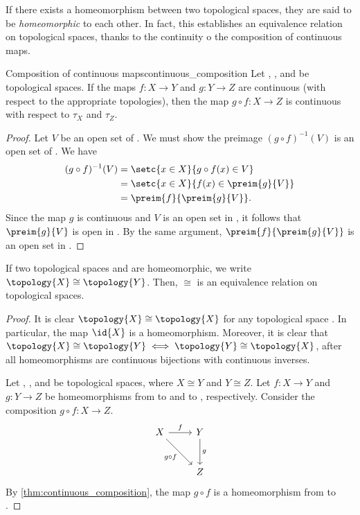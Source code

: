 If there exists a homeomorphism between two topological spaces, they are said to be \emph{homeomorphic} to each other. In fact, this establishes an equivalence relation on topological spaces, thanks to the continuity o the composition of continuous maps.
\begin{theorem}{Composition of continuous maps}{continuous_composition}
Let , , and  be topological spaces. If the maps \(f: X \to Y\) and \(g : Y \to Z\) are continuous (with respect to the appropriate topologies), then the map \(g \circ f : X \to Z\) is continuous with respect to \(\tau_X\) and \(\tau_Z\).
\end{theorem}
\begin{proof}
    Let \(V\) be an open set of . We must show the preimage \((g \circ f)^{-1}(V)\) is an open set of . We have
    \begin{align*}
        (g\circ f)^{-1}(V) &= \setc{x \in X }{g\circ f(x) \in V}\\
                           &= \setc{x \in X }{f(x) \in \preim{g}{V}}\\
                           &= \preim{f}{\preim{g}{V}}.
    \end{align*}
    Since the map \(g\) is continuous and \(V\) is an open set in , it follows that \(\preim{g}{V}\) is open in . By the same argument, \(\preim{f}{\preim{g}{V}}\) is an open set in .
\end{proof}

\begin{corollary}
    If two topological spaces  and  are homeomorphic, we write \(\topology{X} \cong \topology{Y}\). Then, \(\cong\) is an equivalence relation on topological spaces.
\end{corollary}
\begin{proof}
    It is clear \(\topology{X} \cong \topology{X}\) for any topological space . In particular, the map \(\id{X}\) is a homeomorphism. Moreover, it is clear that \(\topology{X} \cong \topology{Y} \iff \topology{Y} \cong \topology{X}\), after all homeomorphisms are continuous bijections with continuous inverses.

    Let , , and  be topological spaces, where \(X \cong Y\) and \(Y \cong Z\). Let \(f : X \to Y\) and \(g : Y \to Z\) be homeomorphisms from  to  and  to , respectively. Consider the composition \(g\circ f : X \to Z\).
    \begin{equation*}
        \begin{tikzcd}[column sep = normal, row sep = large]
            X \arrow{r}{f} \arrow[swap]{dr}{g\circ f} & Y \arrow{d}{g} \\
                                                      & Z
        \end{tikzcd}
    \end{equation*}
    By \cref{thm:continuous_composition}, the map \(g\circ f\) is a homeomorphism from  to .
\end{proof}


